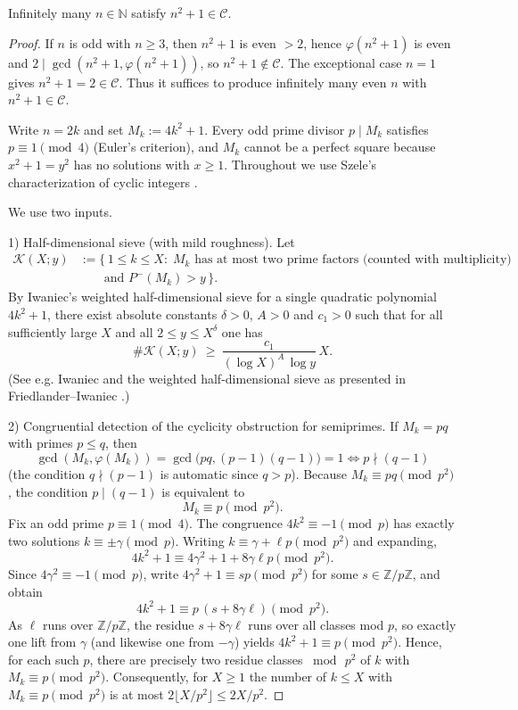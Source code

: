 \begin{theorem}\label{thm:near_square_cyclics}
Infinitely many \(n\in\mathbb{N}\) satisfy \(n^2+1\in\mathcal{C}\).
\end{theorem}

\begin{proof}
If $n$ is odd with $n\ge 3$, then $n^2+1$ is even $>2$, hence $\varphi(n^2+1)$ is even and $2\mid\gcd(n^2+1,\varphi(n^2+1))$, so $n^2+1\notin\mathcal C$. The exceptional case $n=1$ gives $n^2+1=2\in\mathcal C$. Thus it suffices to produce infinitely many even $n$ with $n^2+1\in\mathcal C$.

Write $n=2k$ and set $M_k:=4k^2+1$. Every odd prime divisor $p\mid M_k$ satisfies $p\equiv1\pmod4$ (Euler's criterion), and $M_k$ cannot be a perfect square because $x^2+1=y^2$ has no solutions with $x\ge1$. Throughout we use Szele's characterization of cyclic integers \cite{Szele1947}.

We use two inputs.

1) Half-dimensional sieve (with mild roughness). Let
\[
\begin{aligned}
\mathcal K(X;y)
 &:= \{\,1\le k\le X:\; M_k \text{ has at most two prime factors (counted with multiplicity)}\\
 &\qquad \text{and } P^-(M_k)>y\,\}.
\end{aligned}
\]
By Iwaniec's weighted half-dimensional sieve for a single quadratic polynomial $4k^2+1$, there exist absolute constants $\delta>0$, $A>0$ and $c_1>0$ such that for all sufficiently large $X$ and all $2\le y\le X^{\delta}$ one has
$$
\#\mathcal K(X;y)\ \ge\ \frac{c_1}{(\log X)^{A}\,\log y}\,X.
$$ (See e.g. Iwaniec \cite{Iwaniec1978} and the weighted half-dimensional sieve as presented in Friedlander--Iwaniec \cite{FI2010}.)

2) Congruential detection of the cyclicity obstruction for semiprimes. If $M_k=pq$ with primes $p\le q$, then
$$
\gcd(M_k,\varphi(M_k))=\gcd\bigl(pq,(p-1)(q-1)\bigr)=1
\iff p\nmid(q-1)
$$ (the condition $q\nmid(p-1)$ is automatic since $q>p$). Because $M_k\equiv pq\pmod{p^2}$, the condition $p\mid(q-1)$ is equivalent to
$$
M_k\equiv p\pmod{p^2}.
$$
Fix an odd prime $p\equiv1\pmod4$. The congruence $4k^2\equiv-1\pmod p$ has exactly two solutions $k\equiv\pm\gamma\pmod p$. Writing $k\equiv\gamma+\ell p\pmod{p^2}$ and expanding,
$$
4k^2+1\equiv 4\gamma^2+1+8\gamma\ell p\pmod{p^2}.
$$
Since $4\gamma^2\equiv-1\pmod p$, write $4\gamma^2+1\equiv sp\pmod{p^2}$ for some $s\in\mathbb Z/p\mathbb Z$, and obtain
$$
4k^2+1\equiv p\,(s+8\gamma\ell)\pmod{p^2}.
$$
As $\ell$ runs over $\mathbb Z/p\mathbb Z$, the residue $s+8\gamma\ell$ runs over all classes mod $p$, so exactly one lift from $\gamma$ (and likewise one from $-\gamma$) yields $4k^2+1\equiv p\pmod{p^2}$. Hence, for each such $p$, there are precisely two residue classes $\bmod\,p^2$ of $k$ with $M_k\equiv p\pmod{p^2}$. Consequently, for $X\ge1$ the number of $k\le X$ with $M_k\equiv p\pmod{p^2}$ is at most $2\lfloor X/p^2\rfloor\le 2X/p^2$.


\end{proof}
